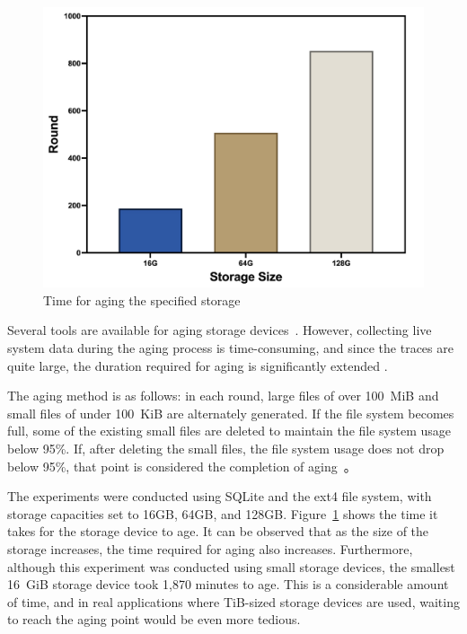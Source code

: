 \begin{figure}[t]
    \centering
    \includegraphics[width=0.95\columnwidth]{graphs/aging_duration}
    \caption{Time for aging the specified storage}
    \label{fig:aging-duration}
\end{figure}

Several tools are available for aging storage devices~\cite{tbbt:fast05, impressions:fast09, conway:login17}.
However, collecting live system data during the aging process is time-consuming, and since the traces are quite large, the duration required for aging is significantly extended \cite{fs-aging:sigmetrics97}.


The aging method is as follows: in each round, large files of over 100~MiB and small files of under 100~KiB are alternately generated.
If the file system becomes full, some of the existing small files are deleted to maintain the file system usage below 95\%.
If, after deleting the small files, the file system usage does not drop below 95\%, that point is considered the completion of aging~\cite{Problem_in_SSD_Empirical}。


The experiments were conducted using SQLite and the ext4 file system, with storage capacities set to 16GB, 64GB, and 128GB.
Figure~\ref{fig:aging-duration} shows the time it takes for the storage device to age.
It can be observed that as the size of the storage increases, the time required for aging also increases.
Furthermore, although this experiment was conducted using small storage devices, the smallest 16~GiB storage device took 1,870 minutes to age.
This is a considerable amount of time, and in real applications where TiB-sized storage devices are used, waiting to reach the aging point would be even more tedious.

